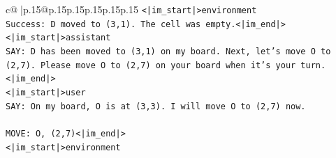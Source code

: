 \documentclass{article}
\begin{document}
{\begin{supertabular}{c@{$\;$}|p{.15\linewidth}@{}p{.15\linewidth}p{.15\linewidth}p{.15\linewidth}p{.15\linewidth}p{.15\linewidth}}
{{{\texttt{<|im\_start|>environment} \\
\texttt{Success: D moved to (3,1). The cell was empty.<|im\_end|>} \\
\texttt{<|im\_start|>assistant} \\
\texttt{SAY: D has been moved to (3,1) on my board. Next, let's move O to (2,7). Please move O to (2,7) on your board when it's your turn.<|im\_end|>} \\
\texttt{<|im\_start|>user} \\
\texttt{SAY: On my board, O is at (3,3). I will move O to (2,7) now.} \\
\\ 
\texttt{MOVE: O, (2,7)<|im\_end|>} \\
\texttt{<|im\_start|>environment} \\
            }
        }
    }
     \\ \\


\end{supertabular}}
\end{document}
